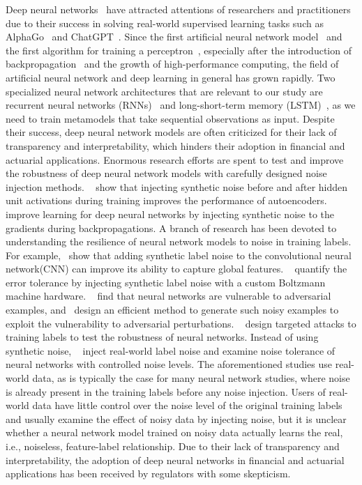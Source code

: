 \documentclass[]{article}
\begin{document}
Deep neural networks~\citep{hastie2009elements,lecun2015deep} have attracted attentions of researchers and practitioners due to their success in solving real-world supervised learning tasks such as AlphaGo~\citep{silver2016mastering} and ChatGPT~\citep{chatgpt}.
Since the first artificial neural network model~\citep{mcculloch1943logical} and the first algorithm for training a perceptron~\citep{rosenblatt1958perceptron}, especially after the introduction of backpropagation~\citep{rumelhart1985learning} and the growth of high-performance computing, the field of artificial neural network and deep learning in general has grown rapidly.
Two specialized neural network architectures that are relevant to our study are recurrent neural networks (RNNs)~\citep{williams1989learning,sutskever2014sequence} and long-short-term memory (LSTM)~\citep{hochreiter1997long,chung2014empirical}, as we need to train metamodels that take sequential observations as input.
Despite their success, deep neural network models are often criticized for their lack of transparency and interpretability, which hinders their adoption in financial and actuarial applications.
Enormous research efforts are spent to test and improve the robustness of deep neural network models with carefully designed noise injection methods.
~\cite{poole2014analyzing} show that injecting synthetic noise before and after hidden unit activations during training improves the performance of autoencoders.
~\cite{neelakantan2015adding} improve learning for deep neural networks by injecting synthetic noise to the gradients during backpropagations.
A branch of research has been devoted to understanding the resilience of neural network models to noise in training labels.
For example,~\cite{luo2016understanding} show that adding synthetic label noise to the convolutional neural network(CNN) can improve its ability to capture global features. 
~\cite{srivastava2014dropout} quantify the error tolerance by injecting synthetic label noise with a custom Boltzmann machine hardware.
~\cite{szegedy2013intriguing} find that neural networks are vulnerable to adversarial examples, and~\cite{goodfellow2014explaining} design an efficient method to generate such noisy examples to exploit the vulnerability to adversarial perturbations.
~\cite{carlini2017towards} design targeted attacks to training labels to test the robustness of neural networks. 
Instead of using synthetic noise, ~\cite{jiang2020beyond} inject real-world label noise and examine noise tolerance of neural networks with controlled noise levels.
The aforementioned studies use real-world data, as is typically the case for many neural network studies, where noise is already present in the training labels before any noise injection.
Users of real-world data have little control over the noise level of the original training labels and usually examine the effect of noisy data by injecting noise, but it is unclear whether a neural network model trained on noisy data actually learns the real, i.e., noiseless, feature-label relationship.
Due to their lack of transparency and interpretability, the adoption of deep neural networks in financial and actuarial applications has been received by regulators with some skepticism.
\end{document}
